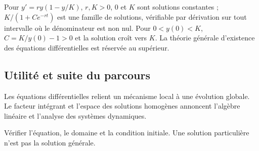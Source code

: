 \documentclass[../cours_tle.tex]{subfiles}
\begin{document}
Pour $y'=ry(1-y/K)$, $r,K>0$, $0$ et $K$ sont solutions constantes ;
$K/(1+Ce^{-rt})$ est une famille de solutions, vérifiable par dérivation sur tout intervalle où le dénominateur est non nul. Pour $0<y(0)<K$, $C=K/y(0)-1>0$ et la solution croît vers $K$. La théorie générale d'existence des équations différentielles est réservée au supérieur.
\begin{finchapitre}
\section{Utilité et suite du parcours}
Les équations différentielles relient un mécanisme local à une évolution globale. Le facteur intégrant et l'espace des solutions homogènes annoncent l'algèbre linéaire et l'analyse des systèmes dynamiques.
\begin{retenir}
Vérifier l'équation, le domaine et la condition initiale. Une solution particulière n'est pas la solution générale.
\end{retenir}
\end{finchapitre}
\end{document}

